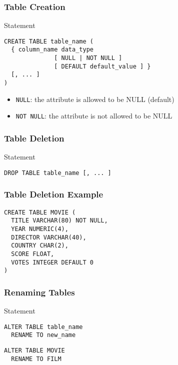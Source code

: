\documentclass[dvipsnames]{beamer}
\theoremstyle{plain}
\begin{document}
\begin{frame}[fragile]
  \frametitle{Table Creation}

  \begin{block}{Statement}
    \begin{lstlisting}
CREATE TABLE table_name (
  { column_name data_type
              [ NULL | NOT NULL ]
              [ DEFAULT default_value ] }
  [, ... ]
)
    \end{lstlisting}
  \end{block}

  \pause
  \begin{itemize}
    \item \lstinline!NULL!: the attribute is allowed to be NULL (default)
    \item \lstinline!NOT NULL!: the attribute is not allowed to be NULL
  \end{itemize}
\end{frame}

\begin{frame}[fragile]
  \frametitle{Table Deletion}

  \begin{block}{Statement}
    \begin{lstlisting}
DROP TABLE table_name [, ... ]
    \end{lstlisting}
  \end{block}
\end{frame}

\begin{frame}[fragile]
  \frametitle{Table Deletion Example}

  \begin{example}
    \begin{lstlisting}
CREATE TABLE MOVIE (
  TITLE VARCHAR(80) NOT NULL,
  YEAR NUMERIC(4),
  DIRECTOR VARCHAR(40),
  COUNTRY CHAR(2),
  SCORE FLOAT,
  VOTES INTEGER DEFAULT 0
)
    \end{lstlisting}
  \end{example}
\end{frame}

\begin{frame}[fragile]
  \frametitle{Renaming Tables}

  \begin{block}{Statement}
    \begin{lstlisting}
ALTER TABLE table_name
  RENAME TO new_name
    \end{lstlisting}
  \end{block}

  \pause
  \begin{example}
    \begin{lstlisting}
ALTER TABLE MOVIE
  RENAME TO FILM
    \end{lstlisting}
  \end{example}
\end{frame}
\end{document}
